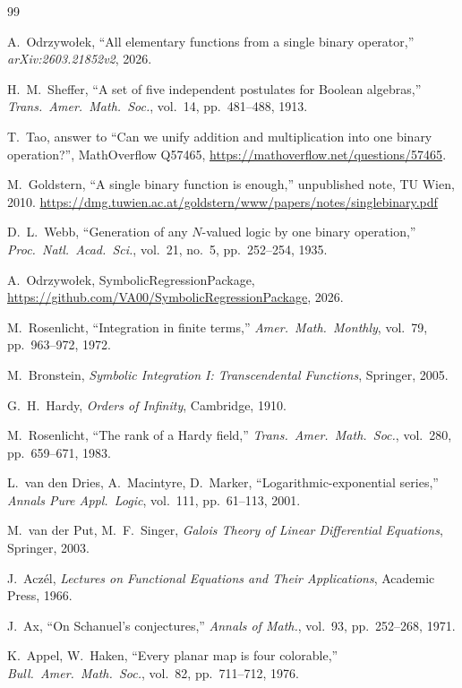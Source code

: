 \documentclass[10pt,twocolumn]{article}
\theoremstyle{remark}
\begin{document}
\begin{thebibliography}{99}

A.~Odrzywołek, ``All elementary functions from a single binary operator,'' \emph{arXiv:2603.21852v2}, 2026.

H.~M.~Sheffer, ``A set of five independent postulates for Boolean algebras,'' \emph{Trans.\ Amer.\ Math.\ Soc.}, vol.~14, pp.~481--488, 1913.

T.~Tao, answer to ``Can we unify addition and multiplication into one binary operation?'', MathOverflow Q57465, \url{https://mathoverflow.net/questions/57465}.

M.~Goldstern, ``A single binary function is enough,'' unpublished note, TU Wien, 2010. \url{https://dmg.tuwien.ac.at/goldstern/www/papers/notes/singlebinary.pdf}

D.~L.~Webb, ``Generation of any $N$-valued logic by one binary operation,'' \emph{Proc.\ Natl.\ Acad.\ Sci.}, vol.~21, no.~5, pp.~252--254, 1935.

A.~Odrzywołek, SymbolicRegressionPackage, \url{https://github.com/VA00/SymbolicRegressionPackage}, 2026.

M.~Rosenlicht, ``Integration in finite terms,'' \emph{Amer.\ Math.\ Monthly}, vol.~79, pp.~963--972, 1972.

M.~Bronstein, \emph{Symbolic Integration I: Transcendental Functions}, Springer, 2005.

G.~H.~Hardy, \emph{Orders of Infinity}, Cambridge, 1910.

M.~Rosenlicht, ``The rank of a Hardy field,'' \emph{Trans.\ Amer.\ Math.\ Soc.}, vol.~280, pp.~659--671, 1983.

L.~van den Dries, A.~Macintyre, D.~Marker, ``Logarithmic-exponential series,'' \emph{Annals Pure Appl.\ Logic}, vol.~111, pp.~61--113, 2001.

M.~van der Put, M.~F.~Singer, \emph{Galois Theory of Linear Differential Equations}, Springer, 2003.

J.~Acz\'{e}l, \emph{Lectures on Functional Equations and Their Applications}, Academic Press, 1966.

J.~Ax, ``On Schanuel's conjectures,'' \emph{Annals of Math.}, vol.~93, pp.~252--268, 1971.

K.~Appel, W.~Haken, ``Every planar map is four colorable,'' \emph{Bull.\ Amer.\ Math.\ Soc.}, vol.~82, pp.~711--712, 1976.

\end{thebibliography}
\end{document}
